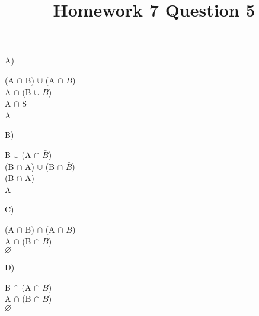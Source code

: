 \documentclass{article}
\title{Homework 7 Question 5}
\author{}
\date{}
\begin{document}
    \maketitle

    A) 
    \begin{center}
        (A $\cap$ B) $\cup$ (A $\cap$ $\bar{B}$)\\
        A $\cap$ (B $\cup$ $\bar{B}$)\\
        A $\cap$ S\\
        A
    \end{center}

    B)
    \begin{center}
        B $\cup$ (A $\cap$ $\bar{B}$)\\
        (B $\cap$ A) $\cup$ (B $\cap$ $\bar{B}$)\\
        (B $\cap$ A)\\
        A
    \end{center}
    
    C)
    \begin{center}
        (A $\cap$ B) $\cap$ (A $\cap$ $\bar{B}$)\\
        A $\cap$ (B $\cap$ $\bar{B}$)\\
        $\varnothing$
    \end{center} 

    D)
    \begin{center}
        B $\cap$ (A $\cap$ $\bar{B}$)\\
        A $\cap$ (B $\cap$ $\bar{B}$)\\
        $\varnothing$ 
    \end{center}
\end{document}
